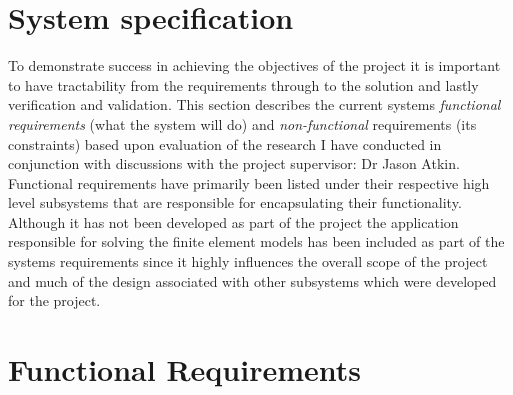 \documentclass{article}
\begin{document}
\section{System specification}
To demonstrate success in achieving the objectives of the project it is important to have tractability from the requirements through to the solution and lastly verification and validation. This section describes the current systems \textit{functional requirements} (what the system will do) and \textit{non-functional} requirements (its constraints) based upon evaluation of the research I have conducted in conjunction with discussions with the project supervisor: Dr Jason Atkin. Functional requirements have primarily been listed under their respective high level subsystems that are responsible for encapsulating their functionality. \\ 

\noindent
Although it has not been developed as part of the project the application responsible for solving the finite element models has been included as part of the systems requirements since it highly influences the overall scope of the project and much of the design associated with other subsystems which were developed for the project. \\ 

\section{Functional Requirements}
\end{document}
